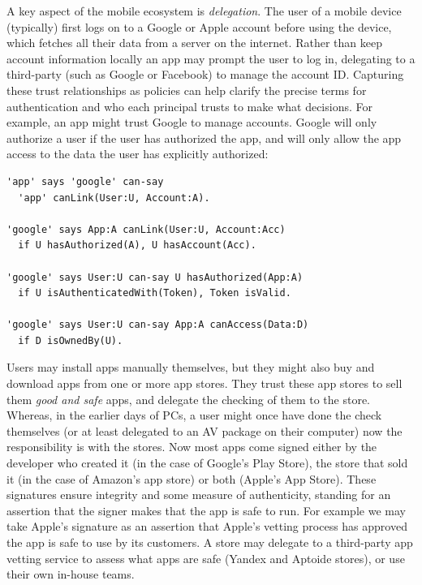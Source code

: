 \documentclass[thesis.tex]{subfiles}
\begin{document}
\vspace{1em}

A key aspect of the mobile ecosystem is \emph{delegation}. The user of a mobile
device (typically) first logs on to a Google or Apple account before using the
device, which fetches all their data from a server on the internet. Rather than
keep account information locally an app may prompt the user to log in,
delegating to a third-party (such as Google or Facebook) to manage the account
ID. Capturing these trust relationships as policies can help clarify the precise
terms for authentication and who each principal trusts to make what decisions.
For example, an app might trust Google to manage accounts. Google will only
authorize a user if the user has authorized the app, and will only allow the app
access to the data the user has explicitly authorized:

\begin{lstlisting}
'app' says 'google' can-say 
  'app' canLink(User:U, Account:A).

'google' says App:A canLink(User:U, Account:Acc)
  if U hasAuthorized(A), U hasAccount(Acc).

'google' says User:U can-say U hasAuthorized(App:A)
  if U isAuthenticatedWith(Token), Token isValid.

'google' says User:U can-say App:A canAccess(Data:D)
  if D isOwnedBy(U).
\end{lstlisting}

Users may install apps manually themselves, but they might also buy and download
apps from one or more app stores. They trust these app stores to sell them
\emph{good and safe} apps, and delegate the checking of them to the store.
Whereas, in the earlier days of PCs, a user might once have done the check
themselves (or at least delegated to an \ac{AV} package on their computer) now
the responsibility is with the stores. Now most apps come signed either by the
developer who created it (in the case of Google's Play Store), the store that
sold it (in the case of Amazon's app store) or both (Apple's App Store). These
signatures ensure integrity and some measure of authenticity, standing for an
assertion that the signer makes that the app is safe to run. For example we may
take Apple's signature as an assertion that Apple's vetting process has approved
the app is safe to use by its customers. A store may delegate to a third-party
app vetting service to assess what apps are safe (Yandex and Aptoide stores), or
use their own in-house teams.
\end{document}
